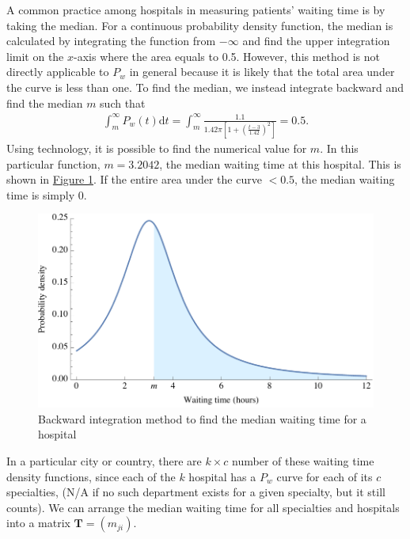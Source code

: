\documentclass{article}
\begin{document}
A common practice among hospitals in measuring patients' waiting time is by taking the median. For a continuous probability density function, the median is calculated by integrating the function from $-\infty$ and find the upper integration limit on the $x$-axis where the area equals to 0.5. However, this method is not directly applicable to $P_w$ in general because it is likely that the total area under the curve is less than one. To find the median, we instead integrate backward and find the median $m$ such that
\begin{gather}
    \int_m^{\infty}P_w\left(t\right) \mathrm{d}t =  \int_m^{\infty} \frac{1.1}{1.42\pi \left[1 + \left( \frac{t -3}{1.42}\right)^2\right]} = 0.5.
\end{gather}
Using technology, it is possible to find the numerical value for $m$. In this particular function, $m = 3.2042$, the median waiting time at this hospital. This is shown in \hyperref[fig:waiting_time_int]{Figure \ref{fig:waiting_time_int}}. If the entire area under the curve $< 0.5$, the median waiting time is simply 0.

\begin{figure}[!htbp]
    \centering
    \includegraphics[scale=0.7]{waiting_time_int.pdf}
    \caption{Backward integration method to find the median waiting time for a hospital}
    \label{fig:waiting_time_int}
\end{figure}

In a particular city or country, there are $k \times c$ number of these waiting time density functions, since each of the $k$ hospital has a $P_w$ curve for each of its $c$ specialties, (N/A if no such department exists for a given specialty, but it still counts). We can arrange the median waiting time for all specialties and hospitals into a matrix $\mathbf{T} = (m_{ji})$.
\end{document}
